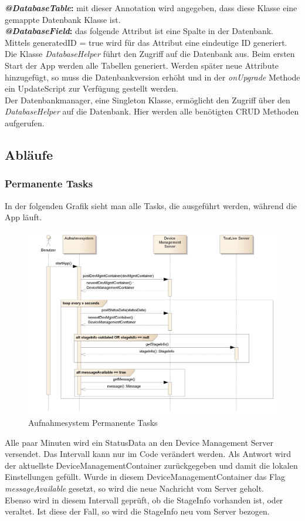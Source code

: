 \textbf{\textit{@DatabaseTable}:} mit dieser Annotation wird angegeben, dass diese Klasse eine gemappte Datenbank Klasse ist.\\
\textbf{\textit{@DatabaseField}:} das folgende Attribut ist eine Spalte in der Datenbank. Mittels generatedID = true wird für das Attribut eine eindeutige ID generiert.\\

Die Klasse \textit{DatabaseHelper} führt den Zugriff auf die Datenbank aus. Beim ersten Start der App werden alle Tabellen generiert. Werden später neue Attribute hinzugefügt, so muss die Datenbankversion erhöht und in der \textit{onUpgrade} Methode ein UpdateScript zur Verfügung gestellt werden.\\

Der Datenbankmanager, eine Singleton Klasse, ermöglicht den Zugriff über den \textit{DatabaseHelper} auf die Datenbank. Hier werden alle benötigten CRUD Methoden aufgerufen.

\subsection{Abläufe}

\subsubsection{Permanente Tasks}
In der folgenden Grafik sieht man alle Tasks, die ausgeführt werden, während die App läuft. 
\begin{figure}[H]
	\centering
	\includegraphics[width=150mm]{images/android/permanent_taskes.jpg}
	\caption{Aufnahmesystem Permanente Tasks}
\end{figure}
Alle paar Minuten wird ein StatusData an den Device Management Server versendet. Das Intervall kann nur im Code verändert werden. Als Antwort wird der aktuellste DeviceManagementContainer zurückgegeben und damit die lokalen Einstellungen gefüllt. Wurde in diesem DeviceManagementContainer das Flag \textit{messageAvailable} gesetzt, so wird die neue Nachricht vom Server geholt.\\
Ebenso wird in diesem Intervall geprüft, ob die StageInfo vorhanden ist, oder veraltet. Ist diese der Fall, so wird die StageInfo neu vom Server bezogen.

